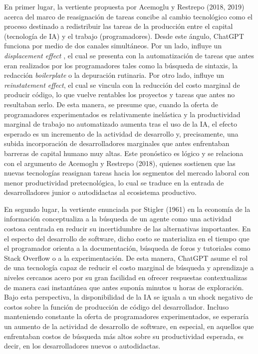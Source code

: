 \documentclass[12pt,a4paper]{article}
\begin{document}
En primer lugar, la vertiente propuesta por Acemoglu y Restrepo (2018, 2019) acerca del marco de reasignación de tareas concibe al cambio tecnológico como el proceso destinado a redistribuir las tareas de la producción entre el capital (tecnología de IA) y el trabajo (programadores). Desde este ángulo, ChatGPT funciona por medio de dos canales simultáneos. Por un lado, influye un \textit{displacement effect} , el cual se presenta con la automatización de tareas que antes eran realizados por los programadores tales como la búsqueda de sintaxis, la redacción \textit{boilerplate}  o la depuración rutinaria. Por otro lado, influye un \textit{reinstatement effect}, el cual se vincula con la reducción del costo marginal de producir código, lo que vuelve rentables los proyectos y tareas que antes no resultaban serlo. De esta manera, se presume que, cuando la oferta de programadores experimentados es relativamente inelástica y la productividad marginal de trabajo no automatizado aumenta tras el uso de la IA, el efecto esperado es un incremento de la actividad de desarrollo y, precisamente, una subida incorporación de desarrolladores marginales que antes enfrentaban barreras de capital humano muy altas. Este pronóstico es lógico y se relaciona con el argumento de Acemoglu y Restrepo (2018), quienes sostienen que las nuevas tecnologías reasignan tareas hacia los segmentos del mercado laboral con menor productividad pretecnológica, lo cual se traduce en la entrada de desarrolladores junior o autodidactas al ecosistema productivo.

En segundo lugar, la vertiente enunciada por Stigler (1961) en la economía de la información conceptualiza a la búsqueda de un agente como una actividad costosa centrada en reducir su incertidumbre de las alternativas importantes. En el especto del desarrollo de software, dicho costo se materializa en el tiempo que el programador orienta a la documentación, búsqueda de foros y tutoriales como Stack Overflow o a la experimentación. De esta manera, ChatGPT asume el rol de una tecnología capaz de reducir el costo marginal de búsqueda y aprendizaje a niveles cercanos acero por su gran facilidad en ofrecer respuestas contextualizas de manera casi instantánea que antes suponía minutos u horas de exploración. Bajo esta perspectiva, la disponibilidad de la IA se iguala a un shock negativo de costos sobre la función de producción de código del desarrollador. Incluso manteniendo constante la oferta de programadores experimentados, se esperaría un aumento de la actividad de desarrollo de software, en especial, en aquellos que enfrentaban costos de búsqueda más altos sobre su productividad esperada, es decir, en los desarrolladores nuevos o autodidactas.
\end{document}
